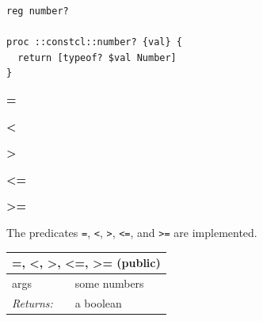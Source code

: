 \documentclass[twoside,9pt]{report}
\begin{document}
\noindent\makebox[\linewidth]{\rule{\linewidth}{0.4pt}}
\begin{lstlisting}
reg number?
 
proc ::constcl::number? {val} {
  return [typeof? $val Number]
}
\end{lstlisting}
\noindent\makebox[\linewidth]{\rule{\linewidth}{0.4pt}}

\textbf{=}


\textbf{<}


\textbf{>}


\textbf{<=}


\textbf{>=}


The predicates \texttt{=}, \texttt{<}, \texttt{>}, \texttt{<=}, and \texttt{>=} are implemented.

\begin{tabular}{ |l l| }
\hline
\multicolumn{2}{|l|}{=, <, >, <=, >= (public)} \\
\hline
args & some numbers \\
\textit{Returns:} & a boolean \\
\hline
\end{tabular}
\end{document}
